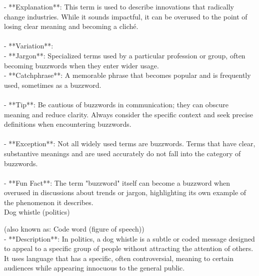 \documentclass[a4paper,12pt,single,pdftex]{scrartcl}
\begin{document}
    
        - **Explanation**: This term is used to describe innovations that radically change industries. While it sounds impactful, it can be overused to the point of losing clear meaning and becoming a cliché.
    \\

    
      
    \\

    
      - **Variation**:
    \\

    
        - **Jargon**: Specialized terms used by a particular profession or group, often becoming buzzwords when they enter wider usage.
    \\

    
        - **Catchphrase**: A memorable phrase that becomes popular and is frequently used, sometimes as a buzzword.
    \\

    
      
    \\

    
      - **Tip**: Be cautious of buzzwords in communication; they can obscure meaning and reduce clarity. Always consider the specific context and seek precise definitions when encountering buzzwords.
    \\

    
      
    \\

    
      - **Exception**: Not all widely used terms are buzzwords. Terms that have clear, substantive meanings and are used accurately do not fall into the category of buzzwords.
    \\

    
      
    \\

    
      - **Fun Fact**: The term "buzzword" itself can become a buzzword when overused in discussions about trends or jargon, highlighting its own example of the phenomenon it describes.
    \\

  

Dog whistle (politics)
    
      (also known as: Code word (figure of speech))
    \\

  
    
      - **Description**: In politics, a dog whistle is a subtle or coded message designed to appeal to a specific group of people without attracting the attention of others. It uses language that has a specific, often controversial, meaning to certain audiences while appearing innocuous to the general public.
    \\
\end{document}
